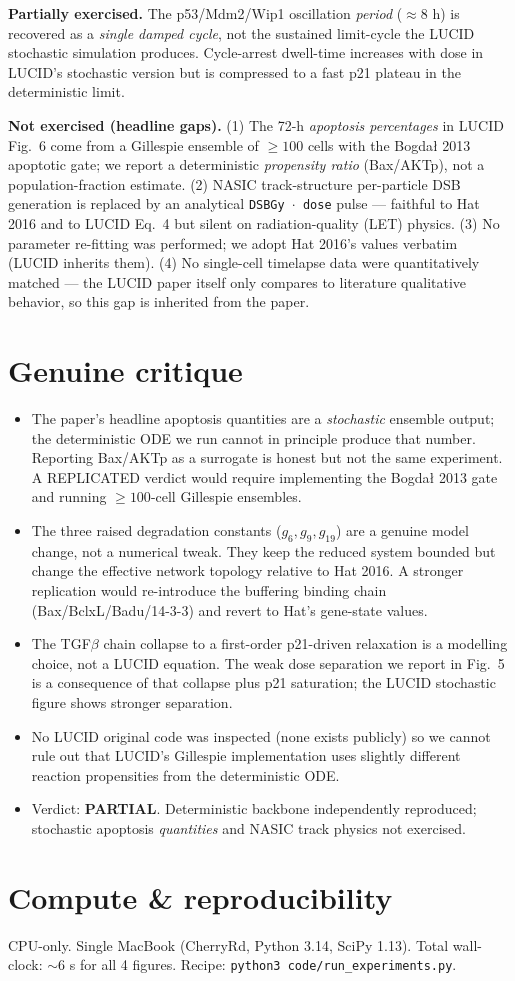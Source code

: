 \documentclass[11pt]{article}
\begin{document}
\textbf{Partially exercised.}
The p53/Mdm2/Wip1 oscillation \emph{period} ($\approx 8$ h) is recovered
as a \emph{single damped cycle}, not the sustained limit-cycle the LUCID
stochastic simulation produces. Cycle-arrest dwell-time increases with dose
in LUCID's stochastic version but is compressed to a fast p21 plateau in the
deterministic limit.

\textbf{Not exercised (headline gaps).}
(1) The 72-h \emph{apoptosis percentages} in LUCID Fig.\ 6 come from a
Gillespie ensemble of $\geq 100$ cells with the Bogda\l{} 2013 apoptotic
gate; we report a deterministic \emph{propensity ratio} (Bax/AKTp), not a
population-fraction estimate. (2) NASIC track-structure per-particle DSB
generation is replaced by an analytical \texttt{DSBGy $\cdot$ dose} pulse ---
faithful to Hat 2016 and to LUCID Eq.\ 4 but silent on radiation-quality (LET)
physics. (3) No parameter re-fitting was performed; we adopt Hat 2016's
values verbatim (LUCID inherits them). (4) No single-cell timelapse data
were quantitatively matched --- the LUCID paper itself only compares to
literature qualitative behavior, so this gap is inherited from the paper.

\section{Genuine critique}
\begin{itemize}
  \item The paper's headline apoptosis quantities are a \emph{stochastic}
        ensemble output; the deterministic ODE we run cannot in principle
        produce that number. Reporting Bax/AKTp as a surrogate is honest but
        not the same experiment. A REPLICATED verdict would require
        implementing the Bogda\l{} 2013 gate and running $\geq 100$-cell
        Gillespie ensembles.
  \item The three raised degradation constants ($g_6, g_9, g_{19}$) are a
        genuine model change, not a numerical tweak. They keep the reduced
        system bounded but change the effective network topology relative to
        Hat 2016. A stronger replication would re-introduce the buffering
        binding chain (Bax/BclxL/Badu/14-3-3) and revert to Hat's gene-state
        values.
  \item The TGF$\beta$ chain collapse to a first-order p21-driven relaxation is
        a modelling choice, not a LUCID equation. The weak dose separation we
        report in Fig.\ 5 is a consequence of that collapse plus p21
        saturation; the LUCID stochastic figure shows stronger separation.
  \item No LUCID original code was inspected (none exists publicly) so we
        cannot rule out that LUCID's Gillespie implementation uses slightly
        different reaction propensities from the deterministic ODE.
  \item Verdict: \textbf{PARTIAL}. Deterministic backbone independently
        reproduced; stochastic apoptosis \emph{quantities} and NASIC track
        physics not exercised.
\end{itemize}

\section{Compute \& reproducibility}
CPU-only. Single MacBook (CherryRd, Python 3.14, SciPy 1.13). Total
wall-clock: $\sim$6 s for all 4 figures. Recipe:
\texttt{python3 code/run\_experiments.py}.


\end{document}
